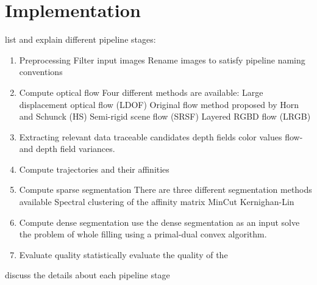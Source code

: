 \chapter{Implementation}

list and explain different pipeline stages:

\begin{enumerate}
\item Preprocessing
	\subitem Filter input images
	\subitem Rename images to satisfy pipeline naming conventions 
\item Compute optical flow
	\subitem Four different methods are available:
	\subitem Large displacement optical flow (LDOF)
	\subitem Original flow method proposed by Horn and Schunck (HS)
	\subitem Semi-rigid scene flow (SRSF)
	\subitem Layered RGBD flow (LRGB)
\item Extracting relevant data
	\subitem traceable candidates
	\subitem depth fields
	\subitem color values
	\subitem flow-and depth field variances.
\item Compute trajectories and their affinities
\item Compute sparse segmentation
	\subitem There are three different segmentation methods available
	\subitem Spectral clustering of the affinity matrix
	\subitem MinCut
	\subitem Kernighan-Lin 
\item Compute dense segmentation
	\subitem use the dense segmentation as an input solve the problem of whole filling using a primal-dual convex algorithm. 
\item Evaluate quality
	\subitem statistically evaluate the quality of the  
\end{enumerate}

discuss the details about each pipeline stage
